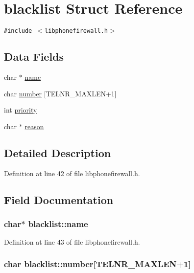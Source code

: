 \hypertarget{structblacklist}{
\section{blacklist Struct Reference}
\label{structblacklist}
}
{\tt \#include $<$libphonefirewall.h$>$}

\subsection*{Data Fields}
\begin{CompactItemize}
\item 
char $\ast$ \hyperlink{structblacklist_a5c11cc627f4b9e68bd1a00332dd3db6}{name}
\item 
char \hyperlink{structblacklist_9c1219b38aa84fc1e5202672e6bc0621}{number} \mbox{[}TELNR\_\-MAXLEN+1\mbox{]}
\item 
int \hyperlink{structblacklist_9586b7070a0df1baf14e4b8e596f5517}{priority}
\item 
char $\ast$ \hyperlink{structblacklist_4fa8b22fda997489930f8dd10dd72be0}{reason}
\end{CompactItemize}


\subsection{Detailed Description}


Definition at line 42 of file libphonefirewall.h.

\subsection{Field Documentation}
\hypertarget{structblacklist_a5c11cc627f4b9e68bd1a00332dd3db6}{
\subsubsection{\setlength{\rightskip}{0pt plus 5cm}char$\ast$ {\bf blacklist::name}}}
\label{structblacklist_a5c11cc627f4b9e68bd1a00332dd3db6}




Definition at line 43 of file libphonefirewall.h.\hypertarget{structblacklist_9c1219b38aa84fc1e5202672e6bc0621}{
\subsubsection{\setlength{\rightskip}{0pt plus 5cm}char {\bf blacklist::number}\mbox{[}TELNR\_\-MAXLEN+1\mbox{]}}}
\label{structblacklist_9c1219b38aa84fc1e5202672e6bc0621}




